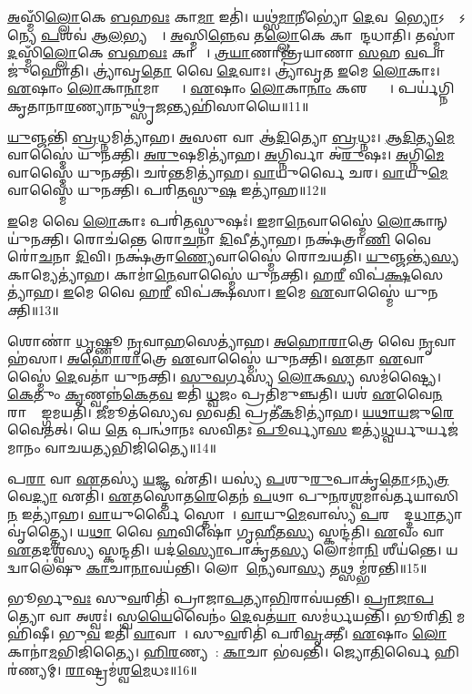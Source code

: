\ul{𑌅}𑌸𑍍𑌮𑌿𑌁\ul{𑌲𑍍𑌲𑍋}𑌕𑍇 \ul{𑌬}𑌹\ul{𑌵𑌃} 𑌕𑌾\ul{𑌮𑌾} 𑌇𑌤𑌿॑।
𑌯𑌥𑍍𑌸॑\ul{𑌮𑌾}𑌨𑍀𑌭𑍍𑌯𑍋॑ \ul{𑌦𑍇}𑌵𑌤𑌾᳚\ul{𑌭𑍍𑌯𑍋}\-𑌽𑌨𑍍𑌯𑍇᳚\-𑌽𑌨𑍍𑌯𑍇 \ul{𑌪}𑌶𑌵॑ 𑌆\ul{𑌲}𑌭𑍍𑌯𑌨𑍍𑌤𑍇᳚।
\ul{𑌅}𑌸𑍍𑌮𑌿\ul{𑌨𑍍𑌨𑍇}𑌵 𑌤\ul{𑌲𑍍𑌲𑍋}𑌕𑍇 𑌕𑌾𑌮𑌾᳚𑌨𑍍𑌦𑌧𑌾𑌤𑌿।
𑌤𑌸𑍍𑌮𑌾॑\ul{𑌦}𑌸𑍍𑌮𑌿𑌁\ul{𑌲𑍍𑌲𑍋}𑌕𑍇 \ul{𑌬}𑌹\ul{𑌵𑌃} 𑌕𑌾𑌮𑌾𑌃᳚।
\ul{𑌤𑍍𑌰}\ul{𑌯𑌾}𑌣𑌾𑌨𑍍𑌤𑍍𑌰॑𑌯𑌾𑌣𑌾 \ul{𑌸}𑌹 \ul{𑌵}𑌪𑌾 𑌜𑍁॑𑌹𑍋𑌤𑌿।
𑌤𑍍𑌰𑍍𑌯𑌾॑𑌵𑍃\ul{𑌤𑍋} 𑌵𑍈 \ul{𑌦𑍇}𑌵𑌾𑌃।
𑌤𑍍𑌰𑍍𑌯𑌾॑𑌵𑍃𑌤 \ul{𑌇}𑌮𑍇 \ul{𑌲𑍋}𑌕𑌾𑌃।
\ul{𑌏}𑌷𑌾𑌂 \ul{𑌲𑍋}𑌕𑌾\ul{𑌨𑌾}𑌮𑌾𑌪𑍍𑌤𑍍𑌯𑍈᳚।
\ul{𑌏}𑌷𑌾𑌂 \ul{𑌲𑍋}𑌕𑌾\ul{𑌨𑌾𑌂} 𑌕𑍢𑌪𑍍𑌤𑍍𑌯𑍈᳚।
𑌪𑌰𑍍𑌯॑𑌗𑍍𑌨𑌿𑌕𑍃𑌤𑌾𑌨𑌾\ul{𑌰}𑌣𑍍𑌯𑌾𑌨𑍁𑌥𑍍𑌸𑍃॑\ul{𑌜}𑌨𑍍𑌤𑍍𑌯𑌹𑌿॑𑌸𑌾𑌯𑍈॥11॥\anuvakamend[𑌅𑌵॑𑌰𑍁𑌦𑍍𑌧𑍍𑌯𑌾 \ul{𑌉}𑌭𑌯𑌾᳚\ul{𑌨𑍍𑌪}𑌶𑍂𑌨𑌾𑌲॑𑌭𑌤𑍇 \ul{𑌸}𑌤𑍍𑌯𑌾𑌦𑌹𑌿\dng{ꣳ}॑𑌸𑌾𑌯𑍈]

\ul{𑌯𑍁}𑌞𑍍𑌜𑌨𑍍𑌤𑌿॑ \ul{𑌬𑍍𑌰}𑌧𑍍𑌨𑌮𑌿𑌤𑍍𑌯𑌾॑𑌹।
\ul{𑌅}𑌸𑍗 𑌵𑌾 𑌆॑\ul{𑌦𑌿}𑌤𑍍𑌯𑍋 \ul{𑌬𑍍𑌰}𑌧𑍍𑌨𑌃।
\ul{𑌆}\ul{𑌦𑌿}𑌤𑍍𑌯\ul{𑌮𑍇}𑌵𑌾𑌸𑍍𑌮𑍈॑ 𑌯𑍁𑌨𑌕𑍍𑌤𑌿।
\ul{𑌅}\ul{𑌰𑍁}𑌷𑌮𑌿𑌤𑍍𑌯𑌾॑𑌹।
\ul{𑌅}𑌗𑍍𑌨𑌿𑌰𑍍𑌵𑌾 𑌅॑\ul{𑌰𑍁}𑌷𑌃।
\ul{𑌅}𑌗𑍍𑌨𑌿\ul{𑌮𑍇}𑌵𑌾𑌸𑍍𑌮𑍈॑ 𑌯𑍁𑌨𑌕𑍍𑌤𑌿।
𑌚𑌰॑\ul{𑌨𑍍𑌤}𑌮𑌿𑌤𑍍𑌯𑌾॑𑌹।
\ul{𑌵𑌾}𑌯𑍁𑌰𑍍𑌵𑍈 𑌚𑌰\sn{}।
\ul{𑌵𑌾}𑌯𑍁\ul{𑌮𑍇}𑌵𑌾𑌸𑍍𑌮𑍈॑ 𑌯𑍁𑌨𑌕𑍍𑌤𑌿।
𑌪𑌰𑌿॑\ul{𑌤}𑌸𑍍𑌥𑍁\ul{𑌷} 𑌇𑌤𑍍𑌯𑌾॑𑌹॥12॥

\ul{𑌇}𑌮𑍇 𑌵𑍈 \ul{𑌲𑍋}𑌕𑌾𑌃 𑌪𑌰𑌿॑\ul{𑌤}𑌸𑍍𑌥𑍁𑌷𑌃॑।
\ul{𑌇}𑌮𑌾\ul{𑌨𑍇}𑌵𑌾𑌸𑍍𑌮𑍈॑ \ul{𑌲𑍋}𑌕𑌾𑌨𑍍 𑌯𑍁॑𑌨𑌕𑍍𑌤𑌿।
𑌰𑍋𑌚॑𑌨𑍍𑌤𑍇 𑌰𑍋\ul{𑌚}𑌨𑌾 \ul{𑌦𑌿}𑌵𑍀𑌤𑍍𑌯𑌾॑𑌹।
𑌨𑌕𑍍𑌷॑𑌤𑍍𑌰𑌾\ul{𑌣𑌿} 𑌵𑍈 𑌰𑍋॑\ul{𑌚}𑌨𑌾 \ul{𑌦𑌿}𑌵𑌿।
𑌨𑌕𑍍𑌷॑𑌤𑍍𑌰𑌾\ul{𑌣𑍍𑌯𑍇}𑌵𑌾𑌸𑍍𑌮𑍈॑ 𑌰𑍋𑌚𑌯𑌤𑌿।
\ul{𑌯𑍁}𑌞𑍍𑌜𑌨𑍍𑌤𑍍𑌯॑\ul{𑌸𑍍𑌯} 𑌕𑌾𑌮𑍍𑌯𑍇𑌤𑍍𑌯𑌾॑𑌹।
𑌕𑌾𑌮𑌾॑\ul{𑌨𑍇}𑌵𑌾𑌸𑍍𑌮𑍈॑ 𑌯𑍁𑌨𑌕𑍍𑌤𑌿।
𑌹\ul{𑌰𑍀} 𑌵𑌿𑌪॑\ul{𑌕𑍍𑌷}𑌸𑍇𑌤𑍍𑌯𑌾॑𑌹।
\ul{𑌇}𑌮𑍇 𑌵𑍈 𑌹\ul{𑌰𑍀} 𑌵𑌿𑌪॑𑌕𑍍𑌷𑌸𑌾।
\ul{𑌇}𑌮𑍇 \ul{𑌏}𑌵𑌾𑌸𑍍𑌮𑍈॑ 𑌯𑍁𑌨𑌕𑍍𑌤𑌿॥13॥

𑌶𑍋𑌣𑌾॑ \ul{𑌧𑍃}𑌷𑍍𑌣𑍂 \ul{𑌨𑍃}𑌵𑌾\ul{𑌹}𑌸𑍇𑌤𑍍𑌯𑌾॑𑌹।
\ul{𑌅}\ul{𑌹𑍋}\ul{𑌰𑌾}𑌤𑍍𑌰𑍇 𑌵𑍈 \ul{𑌨𑍃}𑌵𑌾𑌹॑𑌸𑌾।
\ul{𑌅}\ul{𑌹𑍋}\ul{𑌰𑌾}𑌤𑍍𑌰𑍇 \ul{𑌏}𑌵𑌾𑌸𑍍𑌮𑍈॑ 𑌯𑍁𑌨𑌕𑍍𑌤𑌿।
\ul{𑌏}𑌤𑌾 \ul{𑌏}𑌵𑌾𑌸𑍍𑌮𑍈॑ \ul{𑌦𑍇}𑌵𑌤𑌾॑ 𑌯𑍁𑌨𑌕𑍍𑌤𑌿।
\ul{𑌸𑍁}\ul{𑌵}𑌰𑍍𑌗𑌸𑍍𑌯॑ \ul{𑌲𑍋}𑌕\ul{𑌸𑍍𑌯} 𑌸𑌮॑𑌷𑍍𑌟𑍍𑌯𑍈।
\ul{𑌕𑍇}𑌤𑍁𑌂 \ul{𑌕𑍃}𑌣𑍍𑌵𑌨𑍍𑌨॑\ul{𑌕𑍇}𑌤\ul{𑌵} 𑌇𑌤𑌿॑ \ul{𑌧𑍍𑌵}𑌜𑌂 𑌪𑍍𑌰𑌤𑌿॑\-𑌮𑍁𑌞𑍍𑌚𑌤𑌿।
𑌯𑌶॑ \ul{𑌏}𑌵𑍈\ul{𑌨}\ul{} 𑌰𑌾𑌜𑍍𑌞𑌾᳚𑌙𑍍𑌗𑌮𑌯𑌤𑌿।
\ul{𑌜𑍀}𑌮𑍂𑌤॑𑌸𑍍𑌯𑍇𑌵 𑌭𑌵\ul{𑌤𑌿} 𑌪𑍍𑌰𑌤𑍀॑\ul{𑌕}𑌮𑌿𑌤𑍍𑌯𑌾॑𑌹।
\ul{𑌯}\ul{𑌥𑌾}\ul{𑌯}𑌜𑍁\ul{𑌰𑍇}𑌵𑍈𑌤𑌤𑍍।
𑌯𑍇 \ul{𑌤𑍇} 𑌪𑌨𑍍𑌥𑌾॑𑌨𑌃 𑌸𑌵𑌿𑌤𑌃 \ul{𑌪𑍂}𑌰𑍍𑌵𑍍𑌯𑌾\ul{𑌸} 𑌇𑌤𑍍𑌯॑\ul{𑌧𑍍𑌵}𑌰𑍍𑌯𑍁𑌰𑍍𑌯𑌜॑𑌮𑌾𑌨𑌂 𑌵𑌾𑌚𑌯\ul{𑌤𑍍𑌯}𑌭𑌿𑌜𑌿॑𑌤𑍍𑌯𑍈॥14॥

𑌪\ul{𑌰𑌾} 𑌵𑌾 \ul{𑌏}𑌤𑌸𑍍𑌯॑ \ul{𑌯}𑌜𑍍𑌞 𑌏॑𑌤𑌿।
𑌯𑌸𑍍𑌯॑ \ul{𑌪}𑌶𑍁\ul{𑌰𑍁}𑌪𑌾𑌕𑍃॑\ul{𑌤𑍋}\-𑌽𑌨𑍍𑌯\ul{𑌤𑍍𑌰} 𑌵𑍇\ul{𑌦𑍍𑌯𑌾} 𑌏𑌤𑌿॑।
\ul{𑌏}𑌤𑌸𑍍𑌤𑍋॑𑌤\ul{𑌰𑍇}𑌤𑍇𑌨॑ \ul{𑌪}𑌥𑌾 𑌪𑍁\ul{𑌨}𑌰\ul{𑌶𑍍𑌵}𑌮𑌾𑌵॑𑌰𑍍𑌤𑌯𑌾𑌸𑌿 \ul{𑌨} 𑌇𑌤𑍍𑌯𑌾॑𑌹।
\ul{𑌵𑌾}𑌯𑍁𑌰𑍍𑌵𑍈 𑌸𑍍𑌤𑍋𑌤𑌾᳚।
\ul{𑌵𑌾}𑌯𑍁\ul{𑌮𑍇}𑌵𑌾𑌸𑍍𑌯॑ \ul{𑌪}𑌰𑌸𑍍𑌤𑌾᳚𑌦𑍍𑌦\ul{𑌧𑌾}𑌤𑍍𑌯𑌾𑌵𑍃॑𑌤𑍍𑌤𑍍𑌯𑍈।
𑌯\ul{𑌥𑌾} 𑌵𑍈 \ul{𑌹}𑌵𑌿𑌷𑍋॑ 𑌗𑍃\ul{𑌹𑍀}𑌤\ul{𑌸𑍍𑌯} 𑌸𑍍𑌕𑌨𑍍𑌦॑𑌤𑌿।
\ul{𑌏}𑌵𑌂 𑌵𑌾 \ul{𑌏}𑌤𑌦𑌶𑍍𑌵॑𑌸𑍍𑌯 𑌸𑍍𑌕𑌨𑍍𑌦𑌤𑌿।
𑌯𑌦॑\ul{𑌸𑍍𑌯𑍋}𑌪𑌾𑌕𑍃॑𑌤\ul{𑌸𑍍𑌯} 𑌲𑍋𑌮𑌾॑\ul{𑌨𑌿} 𑌶𑍀𑌯॑𑌨𑍍𑌤𑍇।
𑌯𑌦𑍍𑌵𑌾𑌲𑍇॑𑌷𑍁 \ul{𑌕𑌾}𑌚𑌾\ul{𑌨𑌾}𑌵𑌯॑𑌨𑍍𑌤𑌿।
𑌲𑍋𑌮𑌾᳚\ul{𑌨𑍍𑌯𑍇}𑌵𑌾\ul{𑌸𑍍𑌯} 𑌤𑌥𑍍𑌸𑌮𑍍𑌭॑𑌰𑌨𑍍𑌤𑌿॥15॥

𑌭𑍂𑌰𑍍𑌭𑍁\ul{𑌵𑌃} 𑌸𑍁\ul{𑌵}𑌰𑌿𑌤𑌿॑ 𑌪𑍍𑌰𑌾𑌜𑌾\ul{𑌪}𑌤𑍍𑌯𑌾\ul{𑌭𑌿}𑌰𑌾𑌵॑𑌯𑌨𑍍𑌤𑌿।
\ul{𑌪𑍍𑌰𑌾}\ul{𑌜𑌾}\ul{𑌪}𑌤𑍍𑌯𑍋 𑌵𑌾 𑌅𑌶𑍍𑌵𑌃॑।
𑌸𑍍𑌵\ul{𑌯𑍈}𑌵𑍈𑌨𑌂॑ \ul{𑌦𑍇}𑌵𑌤॑\ul{𑌯𑌾} 𑌸𑌮॑𑌰𑍍𑌧𑌯𑌨𑍍𑌤𑌿।
𑌭𑍂𑌰𑌿\ul{𑌤𑌿} 𑌮𑌹𑌿॑𑌷𑍀।
𑌭𑍁\ul{𑌵} 𑌇𑌤𑌿॑ \ul{𑌵𑌾}𑌵𑌾𑌤𑌾᳚।
𑌸𑍁\ul{𑌵}𑌰𑌿𑌤𑌿॑ 𑌪𑌰𑌿\ul{𑌵𑍃}𑌕𑍍𑌤𑍀।
\ul{𑌏}𑌷𑌾𑌂 \ul{𑌲𑍋}𑌕𑌾𑌨𑌾॑\ul{𑌮}𑌭𑌿𑌜𑌿॑𑌤𑍍𑌯𑍈।
\ul{𑌹𑌿}\ul{𑌰}𑌣𑍍𑌯𑌯𑌾᳚: \ul{𑌕𑌾}𑌚𑌾 𑌭॑𑌵𑌨𑍍𑌤𑌿।
𑌜𑍍𑌯𑍋\ul{𑌤𑌿}𑌰𑍍𑌵𑍈 𑌹𑌿𑌰॑𑌣𑍍𑌯𑌮𑍍।
\ul{𑌰𑌾}𑌷𑍍𑌟𑍍𑌰𑌮॑𑌶𑍍𑌵\ul{𑌮𑍇}𑌧𑌃॥16॥

